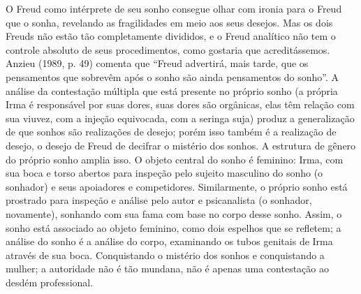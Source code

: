 O Freud como intérprete de seu sonho consegue olhar com ironia para o
Freud que o sonha, revelando as fragilidades em meio aos seus desejos.
Mas os dois Freuds não estão tão completamente divididos, e o Freud
analítico não tem o controle absoluto de seus procedimentos, como
gostaria que acreditássemos. Anzieu (1989, p. 49) comenta que ``Freud
advertirá, mais tarde, que os pensamentos que sobrevêm após o sonho são
ainda pensamentos do sonho''. A análise da contestação múltipla que está
presente no próprio sonho (a própria Irma é responsável por suas dores,
suas dores são orgânicas, elas têm relação com sua viuvez, com a injeção
equivocada, com a seringa suja) produz a generalização de que sonhos são
realizações de desejo; porém isso também é a realização de desejo, o
desejo de Freud de decifrar o mistério dos sonhos. A estrutura de gênero
do próprio sonho amplia isso. O objeto central do sonho é feminino:
Irma, com sua boca e torso abertos para inspeção pelo sujeito masculino
do sonho (o sonhador) e seus apoiadores e competidores. Similarmente, o
próprio sonho está prostrado para inspeção e análise pelo autor e
psicanalista (o sonhador, novamente), sonhando com sua fama com base no
corpo desse sonho. Assim, o sonho está associado ao objeto feminino,
como dois espelhos que se refletem; a análise do sonho é a análise do
corpo, examinando os tubos genitais de Irma através de sua boca.
Conquistando o mistério dos sonhos e conquistando a mulher; a autoridade
não é tão mundana, não é apenas uma contestação ao desdém professional.


